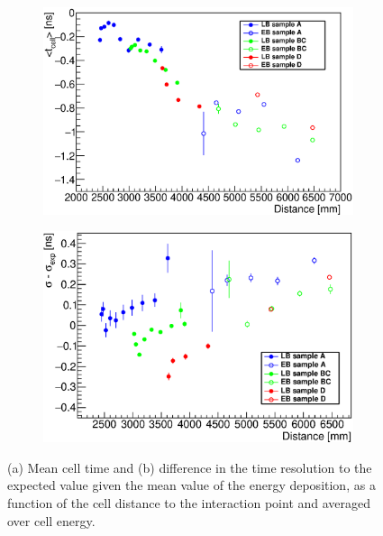 \begin{figure}[tb!]
  \begin{center}
    \begin{subfigure}{0.49\textwidth}
      \includegraphics[width=\textwidth]{TileTimingPerformance/Figures/distance_mean.eps}
      \caption{}
      \label{fig:distance_mean}
    \end{subfigure}
    \begin{subfigure}{0.49\textwidth}
      \includegraphics[width=\textwidth]{TileTimingPerformance/Figures/distance_res.eps}
      \caption{}
    \label{fig:distance_res}
    \end{subfigure}
  \end{center}
  \caption{(a) Mean cell time and (b) difference in the time resolution to the 
  expected value given the mean value of the energy deposition, 
    as a function of the cell distance to the interaction point and averaged over cell energy.
  }
  \label{fig:distance}
\end{figure}


